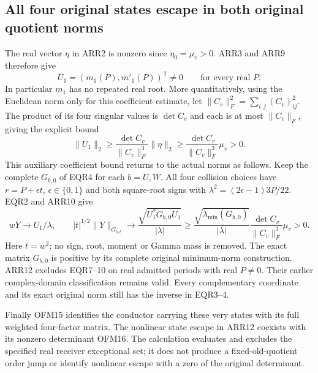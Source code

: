 \subsection{All four original states escape in both original quotient norms}
The real vector $\eta$ in ARR2 is nonzero since $\eta_0=\mu_v>0$.
ARR3 and ARR9 therefore give
\[
 U_1=(m_1(P),m'_1(P))^{\mathsf T}\ne0
 \qquad\text{for every real }P.
 \tag{ARR10}
\]
In particular $m_1$ has no repeated real root. More quantitatively,
using the Euclidean norm only for this coefficient estimate, let
$\|C_v\|_F^2=\sum_{i,j}(C_v)_{ij}^2$.
The product of its four singular values is $\det C_v$ and each is
at most $\|C_v\|_F$, giving the explicit bound
\[
 \|U_1\|_2\ge
 \frac{\det C_v}{\|C_v\|_F^3}\|\eta\|_2
 \ge\frac{\det C_v}{\|C_v\|_F^3}\mu_v>0.
 \tag{ARR11}
\]
This auxiliary coefficient bound returns to the actual norms as
follows. Keep the complete $G_{b,0}$ of EQR4 for each $b=U,W$.
All four collision choices have $r=P+\epsilon t$,
$\epsilon\in\{0,1\}$ and both square-root signs with
$\lambda^2=(2\epsilon-1)3P/22$. EQR2 and ARR10 give
\[
 wY\longrightarrow U_1/\lambda,\qquad
 |t|^{1/2}\|Y\|_{G_{b,t}}\longrightarrow
 \frac{\sqrt{U_1^*G_{b,0}U_1}}{|\lambda|}
 \ge\frac{\sqrt{\lambda_{\min}(G_{b,0})}}{|\lambda|}
       \frac{\det C_v}{\|C_v\|_F^3}\mu_v>0.
 \tag{ARR12}
\]
Here $t=w^2$; no sign, root, moment or Gamma mass is removed.
The exact matrix $G_{b,0}$ is positive by its complete original
minimum-norm construction. ARR12 excludes EQR7--10 on real
admitted periods with real $P\ne0$. Their earlier complex-domain
classification remains valid. Every complementary coordinate and
its exact original norm still has the inverse in EQR3--4.

Finally OFM15 identifies the conductor carrying these very states
with its full weighted four-factor matrix. The nonlinear state
escape in ARR12 coexists with its nonzero determinant OFM16.
The calculation evaluates and excludes the specified real receiver
exceptional set; it does not produce a fixed-old-quotient order jump
or identify nonlinear escape with a zero of the original determinant.
